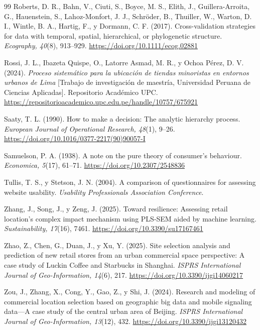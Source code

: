 \documentclass[10pt,letterpaper,twocolumn]{article}
\begin{document}
\begin{thebibliography}{99}
 Roberts, D. R., Bahn, V., Ciuti, S., Boyce, M. S., Elith, J., Guillera-Arroita, G., Hauenstein, S., Lahoz-Monfort, J. J., Schröder, B., Thuiller, W., Warton, D. I., Wintle, B. A., Hartig, F., y Dormann, C. F. (2017). Cross-validation strategies for data with temporal, spatial, hierarchical, or phylogenetic structure. \textit{Ecography, 40}(8), 913--929. \url{https://doi.org/10.1111/ecog.02881}

 Rossi, J. L., Ibazeta Quispe, O., Latorre Asmad, M. R., y Ochoa Pérez, D. V. (2024). \textit{Proceso sistemático para la ubicación de tiendas minoristas en entornos urbanos de Lima} [Trabajo de investigación de maestría, Universidad Peruana de Ciencias Aplicadas]. Repositorio Académico UPC. \url{https://repositorioacademico.upc.edu.pe/handle/10757/675921}

 Saaty, T. L. (1990). How to make a decision: The analytic hierarchy process. \textit{European Journal of Operational Research, 48}(1), 9--26. \url{https://doi.org/10.1016/0377-2217(90)90057-I}

 Samuelson, P. A. (1938). A note on the pure theory of consumer's behaviour. \textit{Economica, 5}(17), 61--71. \url{https://doi.org/10.2307/2548836}

 Tullis, T. S., y Stetson, J. N. (2004). A comparison of questionnaires for assessing website usability. \textit{Usability Professionals Association Conference}.

 Zhang, J., Song, J., y Zeng, J. (2025). Toward resilience: Assessing retail location's complex impact mechanism using PLS-SEM aided by machine learning. \textit{Sustainability, 17}(16), 7461. \url{https://doi.org/10.3390/su17167461}

 Zhao, Z., Chen, G., Duan, J., y Xu, Y. (2025). Site selection analysis and prediction of new retail stores from an urban commercial space perspective: A case study of Luckin Coffee and Starbucks in Shanghai. \textit{ISPRS International Journal of Geo-Information, 14}(6), 217. \url{https://doi.org/10.3390/ijgi14060217}

 Zou, J., Zhang, X., Cong, Y., Gao, Z., y Shi, J. (2024). Research and modeling of commercial location selection based on geographic big data and mobile signaling data---A case study of the central urban area of Beijing. \textit{ISPRS International Journal of Geo-Information, 13}(12), 432. \url{https://doi.org/10.3390/ijgi13120432}

\end{thebibliography}
\end{document}
